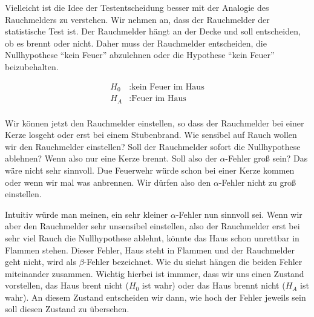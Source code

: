 \documentclass[
  letterpaper,
  DIV=11,
  oneside]{scrreport}
\begin{document}
Vielleicht ist die Idee der Testentscheidung besser mit der Analogie des
Rauchmelders zu verstehen. Wir nehmen an, dass der Rauchmelder der
statistische Test ist. Der Rauchmelder hängt an der Decke und soll
entscheiden, ob es brennt oder nicht. Daher muss der Rauchmelder
entscheiden, die Nullhypothese ``kein Feuer'' abzulehnen oder die
Hypothese ``kein Feuer'' beizubehalten.

\begin{align*} 
H_0&: \mbox{kein Feuer im Haus} \\  
H_A&: \mbox{Feuer im Haus} \\   
\end{align*}

Wir können jetzt den Rauchmelder einstellen, so dass der Rauchmelder bei
einer Kerze losgeht oder erst bei einem Stubenbrand. Wie sensibel auf
Rauch wollen wir den Rauchmelder einstellen? Soll der Rauchmelder sofort
die Nullhypothese ablehnen? Wenn also nur eine Kerze brennt. Soll also
der \(\alpha\)-Fehler groß sein? Das wäre nicht sehr sinnvoll. Due
Feuerwehr würde schon bei einer Kerze kommen oder wenn wir mal was
anbrennen. Wir dürfen also den \(\alpha\)-Fehler nicht zu groß
einstellen.

Intuitiv würde man meinen, ein sehr kleiner \(\alpha\)-Fehler nun
sinnvoll sei. Wenn wir aber den Rauchmelder sehr unsensibel einstellen,
also der Rauchmelder erst bei sehr viel Rauch die Nullhypothese ablehnt,
könnte das Haus schon unrettbar in Flammen stehen. Dieser Fehler, Haus
steht in Flammen und der Rauchmelder geht nicht, wird als
\(\beta\)-Fehler bezeichnet. Wie du siehst hängen die beiden Fehler
miteinander zusammen. Wichtig hierbei ist immmer, dass wir uns einen
Zustand vorstellen, das Haus brent nicht (\(H_0\) ist wahr) oder das
Haus brennt nicht (\(H_A\) ist wahr). An diesem Zustand entscheiden wir
dann, wie hoch der Fehler jeweils sein soll diesen Zustand zu übersehen.
\end{document}
